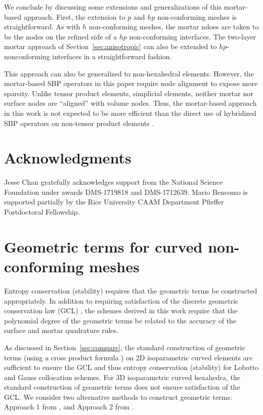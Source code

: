 \documentclass{svjour3}                     %
\begin{document}
We conclude by discussing some extensions and generalizations of this mortar-based approach.  First, the extension to $p$ and $hp$ non-conforming meshes is straightforward.  As with $h$ non-conforming meshes, the mortar ndoes are taken to be the nodes on the refined side of a $hp$ non-conforming interfaces.  The two-layer mortar approach of Section~\ref{sec:anisotropic} can also be extended to $hp$-nonconforming interfaces in a straightforward fashion.  

This approach can also be generalized to non-hexahedral elements.  However, the mortar-based SBP operators in this paper require node alignment to expose more sparsity.  Unlike tensor product elements, simplicial elements, neither mortar nor surface nodes are ``aligned'' with volume nodes.  Thus, the mortar-based approach in this work is not expected to be more efficient than the direct use of hybridized SBP operators on non-tensor product elements \cite{shadpey2019energy}.  



\section{Acknowledgments}

Jesse Chan gratefully acknowledges support from the National Science Foundation under awards DMS-1719818 and DMS-1712639.  Mario Bencomo is supported partially by the Rice University CAAM Department Pfieffer Postdoctoral Fellowship.  


\appendix

\section{Geometric terms for curved non-conforming meshes}
\label{app:A}

Entropy conservation (stability) requires that the geometric terms be constructed appropriately.  In addition to requiring satisfaction of the discrete geometric conservation law (GCL) \cite{kopriva2006metric, crean2018entropy, chan2018discretely}, the schemes derived in this work require that the polynomial degree of the geometric terms be related to the accuracy of the surface and mortar quadrature rules.  

As discussed in Section~\ref{sec:compare}, the standard construction of geometric terms (using a cross product formula \cite{kopriva2006metric, hesthaven2007nodal}) on 2D isoparametric curved elements are sufficient to ensure the GCL and thus entropy conservation (stability) for Lobatto and Gauss collocation schemes.  For 3D isoparametric curved hexahedra, the standard construction of geometric terms does not ensure satisfaction of the GCL.  We consider two alternative methods to construct geometric terms: Approach 1 from \cite{kopriva2006metric}, and Approach 2 from \cite{kozdon2018energy}.  
\end{document}
